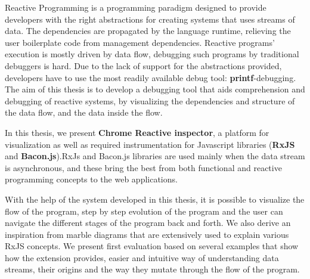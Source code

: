 Reactive Programming is a programming paradigm designed to provide developers with the right abstractions for creating systems that uses streams of data. The dependencies are propagated by the language runtime, relieving the user boilerplate code from management dependencies. Reactive programs' execution is mostly driven by data flow, debugging such programs by traditional debuggers is hard. Due to the lack of support for the abstractions provided, developers have to use the most readily available debug tool: \textbf{printf}-debugging. The aim of this thesis is to develop a debugging tool that aids comprehension and debugging of reactive systems, by visualizing the dependencies and structure of the data flow, and the data inside the flow. 

\vspace*{0.05in}

In this thesis, we present \textbf{Chrome Reactive inspector}, a platform for visualization as well as required instrumentation for Javascript libraries (\textbf{RxJS} and \textbf{Bacon.js}).RxJs and Bacon.js libraries are used mainly when the data stream is asynchronous, and these bring the best from both functional and reactive programming concepts to the web applications. 

\vspace*{0.05in}

With the help of the system developed in this thesis, it is possible to visualize the flow of the program, step by step evolution of the program and the user can navigate the different stages of the program back and forth. We also derive an inspiration from marble diagrams that are extensively used to explain various RxJS concepts. We present first evaluation based on several examples that show how the extension provides, easier and intuitive way of understanding data streams, their origins and the way they mutate through the flow of the program.



















